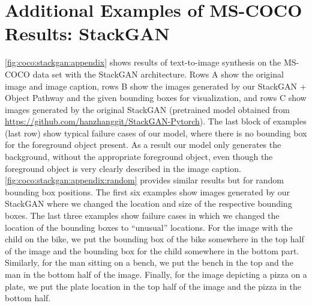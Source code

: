 \documentclass{article} \usepackage{iclr2019_conference,times}
\begin{document}
\section{Additional Examples of MS-COCO Results: StackGAN}
\label{app:fig:mscoco:stackgan}
\vspace{-1em}
	\autoref{fig:coco:stackgan:appendix} shows results of text-to-image synthesis on the MS-COCO data set with the StackGAN architecture.
	Rows A show the original image and image caption, rows B show the images generated by our StackGAN + Object Pathway and the given bounding boxes for visualization, and rows C show images generated by the original StackGAN (pretrained model obtained from \url{https://github.com/hanzhanggit/StackGAN-Pytorch}).
	The last block of examples (last row) show typical failure cases of our model, where there is no bounding box for the foreground object present.
	As a result our model only generates the background, without the appropriate foreground object, even though the foreground object is very clearly described in the image caption.
\autoref{fig:coco:stackgan:appendix:random} provides similar results but for random bounding box positions. The first six examples show images generated by our StackGAN where we changed the location and size of the respective bounding boxes.
	The last three examples show failure cases in which we changed the location of the bounding boxes to ``unusual'' locations. For the image with the child on the bike, we put the bounding box of the bike somewhere in the top half of the image and the bounding box for the child somewhere in the bottom part. Similarly, for the man sitting on a bench, we put the bench in the top and the man in the bottom half of the image. Finally, for the image depicting a pizza on a plate, we put the plate location in the top half of the image and the pizza in the bottom half.
	
\end{document}
